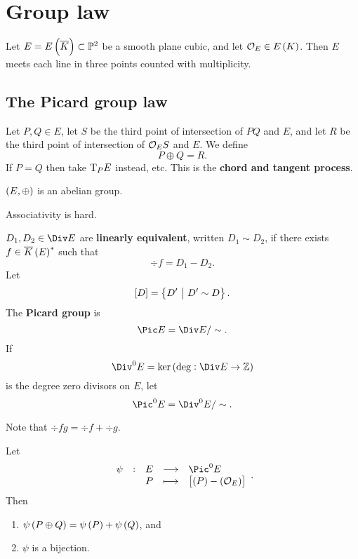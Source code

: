 \pagebreak

\section{Group law}

Let $ E = E\br{\overline{K}} \subset \PP^2 $ be a smooth plane cubic, and let $ \OOO_E \in E\br{K} $. Then $ E $ meets each line in three points counted with multiplicity.

\subsection{The Picard group law}

Let $ P, Q \in E $, let $ S $ be the third point of intersection of $ PQ $ and $ E $, and let $ R $ be the third point of intersection of $ \mathcal{O}_ES $ and $ E $. We define
$$ P \oplus Q = R. $$
If $ P = Q $ then take $ \mathrm{T}_PE $ instead, etc. This is the \textbf{chord and tangent process}.

\begin{theorem}
\label{thm:4.1}
$ \br{E, \oplus} $ is an abelian group.
\end{theorem}

Associativity is hard.

\begin{definition*}
$ D_1, D_2 \in \Div E $ are \textbf{linearly equivalent}, written $ D_1 \sim D_2 $, if there exists $ f \in \overline{K}\br{E}^* $ such that
$$ \div f = D_1 - D_2. $$
Let
$$ \sbr{D} = \cbr{D' \st D' \sim D}. $$
The \textbf{Picard group} is
$$ \Pic E = \Div E / \sim. $$
If
$$ \Div^0 E = \ker \br{\deg : \Div E \to \ZZ} $$
is the degree zero divisors on $ E $, let
$$ \Pic^0 E = \Div^0 E / \sim. $$
\end{definition*}

Note that $ \div fg = \div f + \div g $.

\begin{proposition}
\label{prop:4.2}
Let
$$ \function[\psi]{E}{\Pic^0 E}{P}{\sbr{\br{P} - \br{\OOO_E}}}. $$
Then
\begin{enumerate}
\item $ \psi\br{P \oplus Q} = \psi\br{P} + \psi\br{Q} $, and
\item $ \psi $ is a bijection.
\end{enumerate}
\end{proposition}

